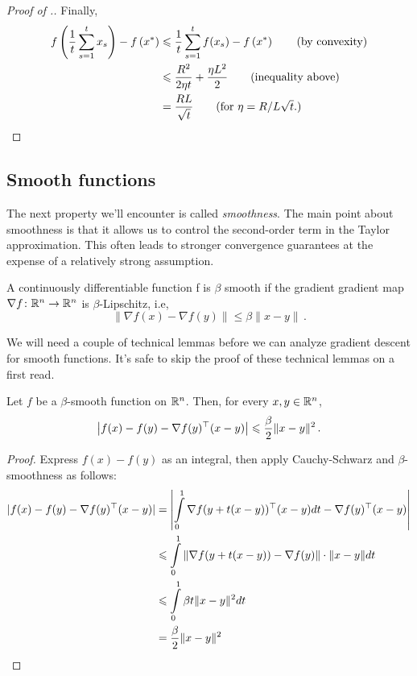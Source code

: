 \begin{proof}[Proof of .]
Finally,
\begin{align*}
    f\left(\frac{1}{t}\sum_{s=1}^t x_s\right) - f\left(x^*\right)
&\leq \frac{1}{t} \sum_{s=1}^t f(x_s) - f\left(x^*\right) \tag{by convexity} \\
&\leq \frac{R^2}{2\eta t} + \frac{\eta L^2}{2} \tag{inequality above}\\
&=\frac{RL}{\sqrt{t}} \tag{for $\eta=R/L\sqrt{t}.$}
\end{align*}

\end{proof}

\subsection{Smooth functions}

The next property we'll encounter is called \emph{smoothness}.  The main point
about smoothness is that it allows us to control the second-order term in the
Taylor approximation. This often leads to stronger convergence guarantees at the
expense of a relatively strong assumption.

\begin{definition}[Smoothness]
A continuously differentiable function f is $\beta$ smooth if the gradient
gradient map $\nabla f\colon\mathbb{R}^n\to\mathbb{R}^n$ is $\beta$-Lipschitz, i.e,
\[
\|\nabla f(x) - \nabla f(y)\| \leq \beta\|x-y\|\,.
\]
\end{definition}

We will need a couple of technical lemmas before we can analyze gradient descent
for smooth functions. It's safe to skip the proof of these technical lemmas on a
first read.

\begin{lemma}
Let $f$ be a $\beta$-smooth function on $\mathbb{R}^n$.  Then, for every $x,y \in \mathbb{R}^n$, 
\[
\left|f(x) - f(y) - \nabla f(y)^\top(x-y)\right| \leqslant \frac{\beta}{2}\|x-y\|^2\,.
\]
\end{lemma}

\begin{proof}
Express $f(x) - f(y)$ as an integral, then apply Cauchy-Schwarz and 
$\beta$-smoothness as follows:
\begin{align*}
|f(x) - f(y) - \nabla f(y)^\top(x-y)|
&=\left|\int\limits_{0}^1 \nabla f(y + t(x-y))^\top(x-y)dt - \nabla
f(y)^\top(x-y)\right|\\
&\leqslant  \int\limits_{0}^1 \|\nabla f(y + t(x-y)) - \nabla f(y)\|\cdot \|x-y\|dt\\
&\leqslant \int\limits_{0}^1 \beta t\|x-y\|^2dt\\
&= \frac{\beta}{2}\|x-y\|^2\qedhere
\end{align*}
\end{proof}

